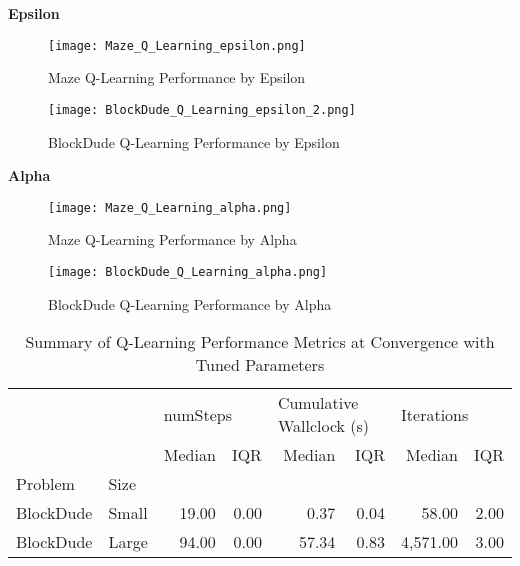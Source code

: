 \documentclass{article}
\begin{document}
\textbf{Epsilon}

\begin{figure}
    \centering
    \begin{minipage}{0.5\textwidth}
        \centering
        \texttt{[image: Maze\_Q\_Learning\_epsilon.png]}
        \caption{Maze Q-Learning Performance by Epsilon}
        \label{fig:maze-ql-epsilon}
    \end{minipage}\hfill
    \begin{minipage}{0.5\textwidth}
        \centering
        \texttt{[image: BlockDude\_Q\_Learning\_epsilon\_2.png]}
        \caption{BlockDude Q-Learning Performance by Epsilon}
        \label{fig:bd-ql-epsilon}
    \end{minipage}
\end{figure}

\textbf{Alpha}

\begin{figure}
    \centering
    \begin{minipage}{0.5\textwidth}
        \centering
        \texttt{[image: Maze\_Q\_Learning\_alpha.png]}
        \caption{Maze Q-Learning Performance by Alpha}
        \label{fig:maze-ql-alpha}
    \end{minipage}\hfill
    \begin{minipage}{0.5\textwidth}
        \centering
        \texttt{[image: BlockDude\_Q\_Learning\_alpha.png]}
        \caption{BlockDude Q-Learning Performance by Alpha}
        \label{fig:bd-ql-alpha}
    \end{minipage}
\end{figure}

\begin{table}
    \centering
    \caption{Summary of Q-Learning Performance Metrics at Convergence with Tuned Parameters}
    \label{table:large-bd-ql}
    \begin{tabular}{llrrrrrr}
        \toprule
           &     & \multicolumn{2}{l}{numSteps} & \multicolumn{2}{l}{Cumulative Wallclock (s)} & \multicolumn{2}{l}{Iterations} \\
           &     &   Median &  IQR &           Median &    IQR &    Median &   IQR \\
        Problem & Size &          &      &                  &        &           &       \\
        \midrule
        BlockDude & Small &    19.00 & 0.00 &         0.37 &  0.04  &     58.00 &  2.00 \\
        BlockDude & Large &    94.00 & 0.00 &         57.34 &  0.83 &  4,571.00 &  3.00 \\
        \bottomrule
        \end{tabular}               
    \end{table} 
    


    {}

\end{document}
